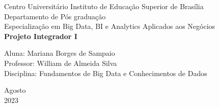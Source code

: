 \documentclass[a4paper, 12pt]{article}
\begin{document}

\begin{titlepage}
	\begin{center}
	

		\Huge{Centro Universitário Instituto de Educação Superior de Brasília}\\
		\large{Departamento de Pós graduação}\\ 
		\large{Especialização em Big Data, BI e Analytics Aplicados aos Negócios}\\ 
		\vspace{12pt}
        \vspace{70pt}
        \textbf{\LARGE{Projeto Integrador I}}\\
		\vspace{3,5cm}
	\end{center}
	
	\begin{flushleft}
		\begin{tabbing}
			Aluna: Mariana Borges de Sampaio \\
			Professor: William de Almeida Silva\\
			Disciplina: Fundamentos de Big Data e Conhecimentos de Dados \\
	\end{tabbing}
 \end{flushleft}
	\vspace{1cm}
	
	\begin{center}
		\vspace{\fill}
			 Agosto\\
		 2023
			\end{center}
\end{titlepage}

\end{document}
